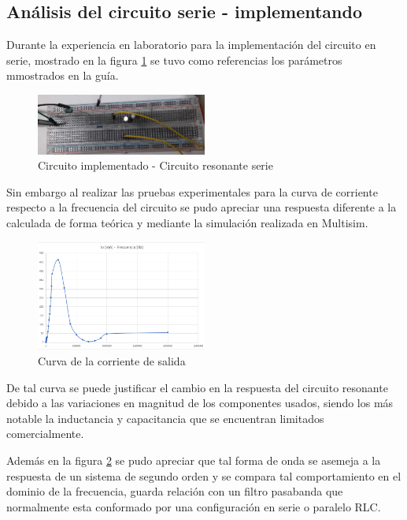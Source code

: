 \documentclass[conference]{IEEEtran}
\begin{document}
 	\subsection{Análisis del circuito serie - implementando }
 	
 	Durante la experiencia en laboratorio para la implementación del circuito en serie, mostrado en la figura \ref{fig:implementacion-serie} se tuvo como referencias los parámetros mmostrados en la guía.
 	
 	\begin{figure}[h]
 		\centering
 		\includegraphics[width=0.5\textwidth]{media/implementacion-serie}
 		\caption{Circuito implementado - Circuito resonante serie}
 		\label{fig:implementacion-serie}
 	\end{figure}
 	
 	Sin embargo al realizar las pruebas experimentales para la curva de corriente respecto a la frecuencia del circuito se pudo apreciar una respuesta diferente a la calculada de forma teórica y mediante la simulación realizada en Multisim. 
 	
 	\begin{figure}[h]
 		\centering
 		\includegraphics[width=0.5\textwidth]{media/curva-salida}
 		\caption{Curva de la corriente de salida}
 		\label{fig:curva-salida}
 	\end{figure}
 	
 	De tal curva se puede justificar el cambio en la respuesta del circuito resonante debido a las variaciones en magnitud de los componentes usados, siendo los más notable la inductancia y capacitancia que se encuentran limitados comercialmente.
 	
 	Además en la figura \ref{fig:curva-salida} se pudo apreciar que tal forma de onda se asemeja a la respuesta de un sistema de segundo orden y se compara tal comportamiento en el dominio de la frecuencia, guarda relación con un filtro pasabanda que normalmente esta conformado por una configuración en serie o paralelo RLC.
 	
\end{document}
